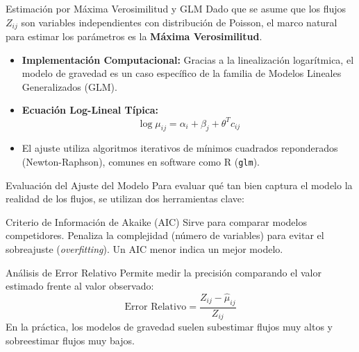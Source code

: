\documentclass[10pt]{beamer}
\begin{document}
    \begin{frame}{Estimación por Máxima Verosimilitud y GLM}
        \justifying
        Dado que se asume que los flujos $Z_{ij}$ son variables independientes con distribución de Poisson, el marco natural para estimar los parámetros es la \textbf{Máxima Verosimilitud}.
        
        \begin{itemize}
            \item \textbf{Implementación Computacional:} Gracias a la linealización logarítmica, el modelo de gravedad es un caso específico de la familia de Modelos Lineales Generalizados (GLM).
            \item \textbf{Ecuación Log-Lineal Típica:}
            \begin{equation}
                \log \mu_{ij} = \alpha_i + \beta_j + \theta^T c_{ij}
            \end{equation}
            \item El ajuste utiliza algoritmos iterativos de mínimos cuadrados reponderados (Newton-Raphson), comunes en software como R (\texttt{glm}).
        \end{itemize}
    \end{frame}


    
    \begin{frame}{Evaluación del Ajuste del Modelo}
        \justifying
        Para evaluar qué tan bien captura el modelo la realidad de los flujos, se utilizan dos herramientas clave:
        
        \begin{block}{Criterio de Información de Akaike (AIC)}
            Sirve para comparar modelos competidores. Penaliza la complejidad (número de variables) para evitar el sobreajuste (\textit{overfitting}). Un AIC menor indica un mejor modelo.
        \end{block}

        \begin{block}{Análisis de Error Relativo}
            Permite medir la precisión comparando el valor estimado frente al valor observado:
            \begin{equation}
                \text{Error Relativo} = \frac{Z_{ij} - \hat{\mu}_{ij}}{Z_{ij}}
            \end{equation}
            En la práctica, los modelos de gravedad suelen subestimar flujos muy altos y sobreestimar flujos muy bajos.
        \end{block}
    \end{frame}
\end{document}
